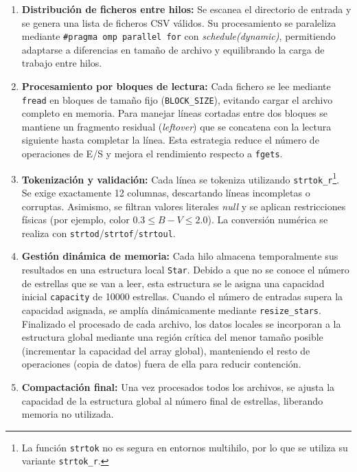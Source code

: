\begin{enumerate}
    \item \textbf{Distribución de ficheros entre hilos:}
    Se escanea el directorio de entrada y se genera una lista de ficheros CSV válidos.
    Su procesamiento se paraleliza mediante \texttt{\#pragma omp parallel for} con \textit{schedule(dynamic)}, permitiendo adaptarse a diferencias en tamaño de archivo y equilibrando la carga de trabajo entre hilos.

    \item \textbf{Procesamiento por bloques de lectura:}
    Cada fichero se lee mediante \texttt{fread} en bloques de tamaño fijo (\texttt{BLOCK\_SIZE}), evitando cargar el archivo completo en memoria.
    Para manejar líneas cortadas entre dos bloques se mantiene un fragmento residual (\textit{leftover}) que se concatena con la lectura siguiente hasta completar la línea.
    Esta estrategia reduce el número de operaciones de E/S y mejora el rendimiento respecto a \texttt{fgets}.

    \item \textbf{Tokenización y validación:}
    Cada línea se tokeniza utilizando \texttt{strtok\_r}\footnote{La función \texttt{strtok} no es segura en entornos multihilo, por lo que se utiliza su variante \texttt{strtok\_r}.}.
    Se exige exactamente 12 columnas, descartando líneas incompletas o corruptas.
    Asimismo, se filtran valores literales \textit{null} y se aplican restricciones físicas (por ejemplo, color \(0.3 \leq B\!-\!V \leq 2.0\)).
    La conversión numérica se realiza con \texttt{strtod}/\texttt{strtof}/\texttt{strtoul}.

    \item \textbf{Gestión dinámica de memoria:}
    Cada hilo almacena temporalmente sus resultados en una estructura local \texttt{Star}.
    Debido a que no se conoce el número de estrellas que se van a leer, esta estructura se le asigna una capacidad inicial \texttt{capacity} de 10000 estrellas.
    Cuando el número de entradas supera la capacidad asignada, se amplía dinámicamente mediante \texttt{resize\_stars}.
    Finalizado el procesado de cada archivo, los datos locales se incorporan a la estructura global mediante una región crítica del menor tamaño posible (incrementar la capacidad del array global), manteniendo el resto de operaciones (copia de datos) fuera de ella para reducir contención.

    \item \textbf{Compactación final:}
    Una vez procesados todos los archivos, se ajusta la capacidad de la estructura global al número final de estrellas, liberando memoria no utilizada.
\end{enumerate}

